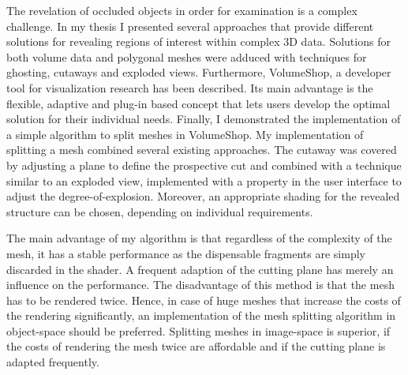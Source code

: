 
The revelation of occluded objects in order for examination is a complex challenge. In my thesis I presented several approaches that provide different solutions for revealing regions of interest within complex 3D data. Solutions for both volume data and polygonal meshes were adduced with techniques for ghosting, cutaways and exploded views. Furthermore, VolumeShop, a developer tool for visualization research has been described. Its main advantage is the flexible, adaptive and plug-in based concept that lets users develop the optimal solution for their individual needs. Finally, I demonstrated the implementation of a simple algorithm to split meshes in VolumeShop. My implementation of splitting a mesh combined several existing approaches. The cutaway was covered by adjusting a plane to define the prospective cut and combined with a technique similar to an exploded view, implemented with a property in the user interface to adjust the degree-of-explosion. Moreover, an appropriate shading for the revealed structure can be chosen, depending on individual requirements.

The main advantage of my algorithm is that regardless of the complexity of the mesh, it has a stable performance as the dispensable fragments are simply discarded in the shader. A frequent adaption of the cutting plane has merely an influence on the performance. The disadvantage of this method is that the mesh has to be rendered twice. Hence, in case of huge meshes that increase the costs of the rendering significantly, an implementation of the mesh splitting algorithm in object-space should be preferred. Splitting meshes in image-space is superior, if the costs of rendering the mesh twice are affordable and if the cutting plane is adapted frequently.